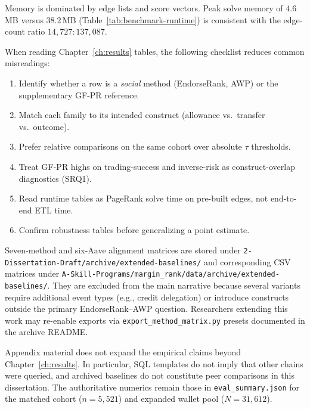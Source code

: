 Memory is dominated by edge lists and score vectors. Peak solve memory of $4.6$\,MB versus $38.2$\,MB (Table~\ref{tab:benchmark-runtime}) is consistent with the edge-count ratio $14{,}727:137{,}087$.


When reading Chapter~\ref{ch:results} tables, the following checklist reduces common misreadings:

\begin{enumerate}
\item Identify whether a row is a \emph{social} method (EndorseRank, AWP) or the supplementary GF-PR reference.
\item Match each family to its intended construct (allowance vs.\ transfer vs.\ outcome).
\item Prefer relative comparisons on the same cohort over absolute $\tau$ thresholds.
\item Treat GF-PR highs on trading-success and inverse-risk as construct-overlap diagnostics (SRQ1).
\item Read runtime tables as PageRank solve time on pre-built edges, not end-to-end ETL time.
\item Confirm robustness tables before generalizing a point estimate.
\end{enumerate}


Seven-method and six-Aave alignment matrices are stored under \texttt{2-Dissertation-Draft/archive/extended-baselines/} and corresponding CSV matrices under \texttt{A-Skill-Programs/margin\_rank/data/archive/extended-baselines/}. They are excluded from the main narrative because several variants require additional event types (e.g., credit delegation) or introduce constructs outside the primary EndorseRank--AWP question. Researchers extending this work may re-enable exports via \texttt{export\_method\_matrix.py} presets documented in the archive README.


Appendix material does not expand the empirical claims beyond Chapter~\ref{ch:results}. In particular, SQL templates do not imply that other chains were queried, and archived baselines do not constitute peer comparisons in this dissertation. The authoritative numerics remain those in \texttt{eval\_summary.json} for the matched cohort ($n=5{,}521$) and expanded wallet pool ($N=31{,}612$).
